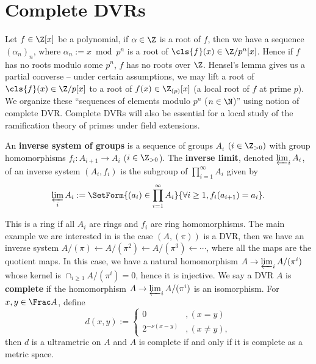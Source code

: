 \documentclass[11pt]{amsart}
\begin{document}
\section{Complete DVRs}

Let $f \in \Z[x]$ be a polynomial, if $\alpha \in \Z$ is a root of $f$, then we
have a sequence $(\alpha_n)_n$, where $\alpha_n := x \bmod{p^n}$ is a root of
$\cls{f}(x) \in \Z\slash p^n[x]$.  Hence if $f$ has no roots modulo some $p^n$, $f$
has no roots over $\Z$.  Hensel's lemma gives us a partial converse -- under
certain assumptions, we may lift a root of $\cls{f}(x) \in \Z\slash p[x]$ to a root of
$f(x) \in \Z_{(p)}[x]$ (a local root of $f$ at prime $p$).  We organize these
``sequences of elements modulo $p^n$ ($n \in \N$)'' using notion of complete
DVR.  Complete DVRs will also be essential for a local study of the ramification
theory of primes under field extensions.

An {\bf inverse system of groups}  is a sequence of
groups $A_i$ $(i \in \Z_{>0})$ with group homomorphisms $f_i : A_{i+1} \to A_i$
($i \in \Z_{>0}$).  The {\bf inverse limit}, denoted $\varprojlim_i A_i$, of an
inverse system $(A_i, f_i)$ is the subgroup of $\prod_{i=1}^{\infty} A_i$ given
by
\[
    \varprojlim_{i} A_i := \SetForm{(a_i) \in \prod_{i=1}^{\infty} A_i}{\forall
    i \geq 1, f_i(a_{i+1}) = a_i}.
\]

This is a ring if all $A_i$ are rings and $f_i$ are ring homomorphisms.  The
main example we are interested in is the case $(A, (\pi))$ is a DVR, then we
have an inverse system $A/(\pi) \leftarrow A/(\pi^2) \leftarrow A/(\pi^3)
\leftarrow \cdots$, where all the maps are the quotient maps.  In this case, we
have a natural homomorphism $A \to \varprojlim_{i} A/(\pi^i)$ whose kernel is
$\cap_{i \geq 1} A/(\pi^i) = 0$, hence it is injective.  We say a DVR $A$ is
{\bf complete}  if the homomorphism $A \to \varprojlim_i
A/(\pi^i)$ is an isomorphism.
%
For $x,y \in \Frac A$, define
\[
    d(x, y) := \begin{cases}
        0 & , (x = y)\\
        2^{-\nu(x-y)} & , (x \neq y),
    \end{cases}
\]
then $d$ is a ultrametric on $A$ and $A$ is complete if and only if it is
complete as a metric space.

\medskip
\end{document}
